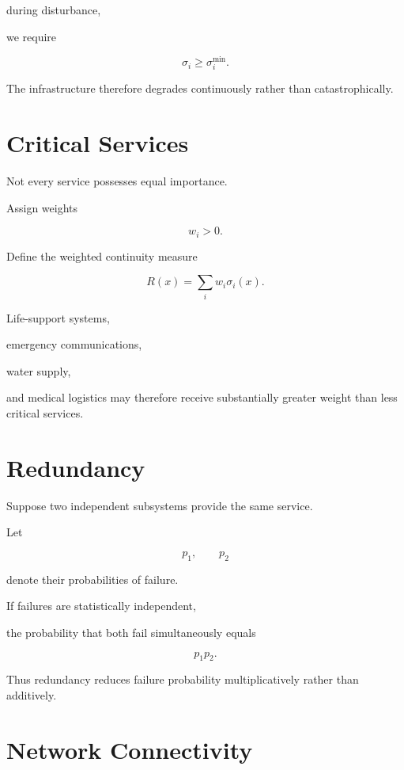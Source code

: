 \documentclass[11pt,fleqn]{book}
\numberwithin{equation}{chapter}
\theoremstyle{plain}
\theoremstyle{definition}
\theoremstyle{remark}
\begin{document}
during disturbance,

we require

\[
\sigma_i
\ge
\sigma_i^{\min}.
\]

The infrastructure therefore degrades continuously rather than
catastrophically.


\section{Critical Services}

Not every service possesses equal importance.

Assign weights

\[
w_i>0.
\]

Define the weighted continuity measure

\[
\boxed{
R(x)
=
\sum_i
w_i
\sigma_i(x).
}
\]

Life-support systems,

emergency communications,

water supply,

and medical logistics may therefore receive substantially greater weight
than less critical services.


\section{Redundancy}

Suppose two independent subsystems provide the same service.

Let

\[
p_1,
\qquad
p_2
\]

denote their probabilities of failure.

If failures are statistically independent,

the probability that both fail simultaneously equals

\[
p_1p_2.
\]

Thus redundancy reduces failure probability multiplicatively rather than
additively.


\section{Network Connectivity}
\end{document}
